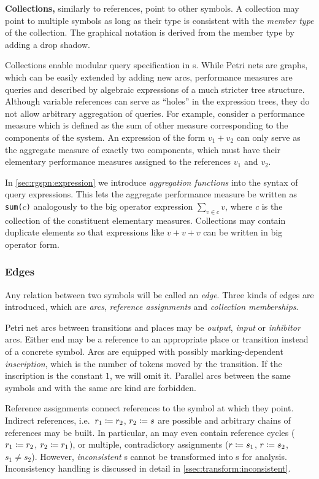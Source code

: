 \newpara \textbf{Collections,} similarly to references, point to other symbols.
A collection may point to multiple symbols as long as their type is consistent with the \emph{member type} of the collection. The graphical notation is derived from the member type by adding a drop shadow.

Collections enable modular query specification in s. While Petri nets are graphs, which can be easily extended by adding new arcs, performance measures are queries and described by algebraic expressions of a much stricter tree structure. Although variable references can serve as \enquote{holes} in the expression trees, they do not allow arbitrary aggregation of queries. For example, consider a performance measure which is defined as the sum of other measure corresponding to the components of the system. An expression of the form \(v_1 + v_2\) can only serve as the aggregate measure of exactly two components, which must have their elementary performance measures assigned to the references \(v_1\) and \(v_2\).

In \vref{sec:rgspn:expression} we introduce \emph{aggregation functions} into the syntax of query expressions. This lets the aggregate performance measure be written as \texttt{sum(\(c\))} analogously to the big operator expression \(\sum_{v \in c} v\), where \(c\) is the collection of the constituent elementary measures. Collections may contain duplicate elements so that expressions like \(v + v + v\) can be written in big operator form.

\subsubsection{Edges}

Any relation between two  symbols will be called an \emph{edge}. Three kinds of edges are introduced, which are \emph{arcs}, \emph{reference assignments} and \emph{collection memberships}.

Petri net arcs between transitions and places may be \emph{output}, \emph{input} or \emph{inhibitor} arcs. Either end may be a reference to an appropriate place or transition instead of a concrete symbol. Arcs are equipped with possibly marking-dependent \emph{inscription}, which is the number of tokens moved by the transition. If the inscription is the constant \(1\), we will omit it. Parallel arcs between the same symbols and with the same arc kind are forbidden.

Reference assignments connect references to the symbol at which they point. Indirect references, i.e.~\(r_1 \coloneq r_2\), \(r_2 \coloneq s\) are possible and arbitrary chains of references may be built. In particular, an  may even contain reference cycles (\(r_1 \coloneq r_2\), \(r_2 \coloneq r_1\)), or multiple, contradictory assignments (\(r \coloneq s_1\), \(r \coloneq s_2\), \(s_1 \ne s_2\)). However, \emph{inconsistent} s cannot be transformed into s for analysis. Inconsistency handling is discussed in detail in \vref{ssec:transform:inconsistent}.


